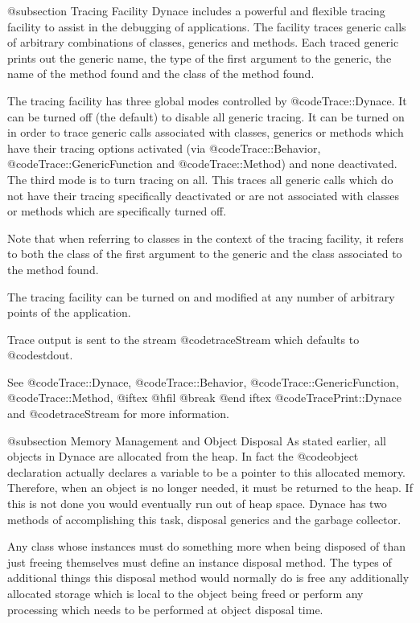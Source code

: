 @subsection Tracing Facility
Dynace includes a powerful and flexible tracing facility to assist
in the debugging of applications.  The facility traces generic calls
of arbitrary combinations of classes, generics and methods.
Each traced generic prints out the generic name, the type of the first
argument to the generic, the name of the method found and the class
of the method found.

The tracing facility has three global modes controlled by
@code{Trace::Dynace}.  It can be turned off (the default)
to disable all generic tracing.  It can be turned on in order to
trace generic calls associated with classes, generics or methods
which have their tracing options activated (via @code{Trace::Behavior},
@code{Trace::GenericFunction} and @code{Trace::Method}) and none
deactivated.  The third mode is to turn tracing on all.  This traces
all generic calls which do not have their tracing specifically
deactivated or are not associated with classes or methods which
are specifically turned off.

Note that when referring to classes in the context of the tracing
facility, it refers to both the class of the first argument to
the generic and the class associated to the method found.

The tracing facility can be turned on and modified at any number of
arbitrary points of the application.

Trace output is sent to the stream @code{traceStream} which defaults
to @code{stdout}.

See @code{Trace::Dynace}, @code{Trace::Behavior},
@code{Trace::GenericFunction}, @code{Trace::Method},
@iftex 
@hfil @break 
@end iftex
@code{TracePrint::Dynace} and @code{traceStream} for more information.




@subsection Memory Management and Object Disposal
As stated earlier, all objects in Dynace are allocated from the heap.  In
fact the @code{object} declaration actually declares a variable to be a
pointer to this allocated memory.  Therefore, when an object is no
longer needed, it must be returned to the heap.  If this is not done you
would eventually run out of heap space.  Dynace has two methods of
accomplishing this task, disposal generics and the garbage collector.

Any class whose instances must do something more when
being disposed of than just freeing themselves must define an instance
disposal method.  The types of additional things this disposal method
would normally do is free any additionally allocated storage which is
local to the object being freed or perform any processing which needs
to be performed at object disposal time.


